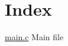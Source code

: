 \hypertarget{index_index_sec}{}\section{Index}\label{index_index_sec}
\begin{DoxyItemize}
\item \hyperlink{main_8c}{main.\+c} Main file \end{DoxyItemize}
